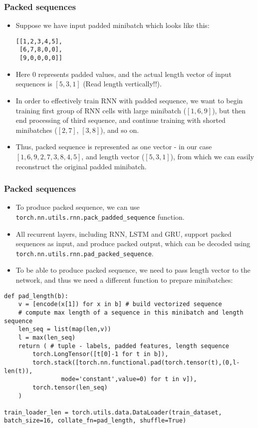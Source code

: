 \begin{frame}[fragile] \frametitle{Packed sequences}

\begin{itemize}
\item Suppose we have input padded minibatch which looks like this:

\begin{lstlisting}
[[1,2,3,4,5],
 [6,7,8,0,0],
 [9,0,0,0,0]]
\end{lstlisting}

\item Here 0 represents padded values, and the actual length vector of input sequences is $[5,3,1]$ (Read length vertically!!).

\item In order to effectively train RNN with padded sequence, we want to begin training first group of RNN cells with large minibatch ($[1,6,9]$), but then end processing of third sequence, and continue training with shorted minibatches ($[2,7]$, $[3,8]$), and so on. 
\item Thus, packed sequence is represented as one vector - in our case $[1,6,9,2,7,3,8,4,5]$, and length vector ($[5,3,1]$), from which we can easily reconstruct the original padded minibatch.
\end{itemize}



\end{frame}

\begin{frame}[fragile] \frametitle{Packed sequences}

\begin{itemize}
\item  To produce packed sequence, we can use \lstinline|torch.nn.utils.rnn.pack_padded_sequence| function. 
\item All recurrent layers, including RNN, LSTM and GRU, support packed sequences as input, and produce packed output, which can be decoded using \lstinline|torch.nn.utils.rnn.pad_packed_sequence|.
\item To be able to produce packed sequence, we need to pass length vector to the network, and thus we need a different function to prepare minibatches:
\end{itemize}

\begin{lstlisting}
def pad_length(b):
    v = [encode(x[1]) for x in b] # build vectorized sequence
    # compute max length of a sequence in this minibatch and length sequence
    len_seq = list(map(len,v))
    l = max(len_seq)
    return ( # tuple - labels, padded features, length sequence
        torch.LongTensor([t[0]-1 for t in b]),
        torch.stack([torch.nn.functional.pad(torch.tensor(t),(0,l-len(t)),
				mode='constant',value=0) for t in v]),
        torch.tensor(len_seq)
    )

train_loader_len = torch.utils.data.DataLoader(train_dataset, batch_size=16, collate_fn=pad_length, shuffle=True)
\end{lstlisting}

\end{frame}

